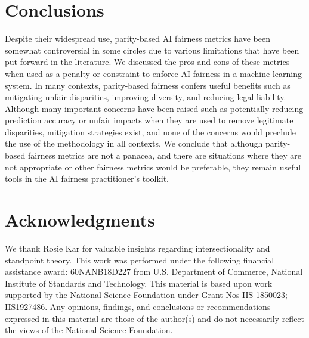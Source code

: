 \documentclass[11pt,dvipdfm]{article}
\begin{document}
	
	
 

\section{Conclusions}
Despite their widespread use, parity-based AI fairness metrics have been somewhat controversial in some circles due to various limitations that have been put forward in the literature.  We discussed the pros and cons of these metrics when used as a penalty or constraint to enforce AI fairness in a machine learning system.  In many contexts, parity-based fairness confers useful benefits such as mitigating unfair disparities, improving diversity, and reducing legal liability.  Although many important concerns have been raised such as potentially reducing prediction accuracy or unfair impacts when they are used to remove legitimate disparities, mitigation strategies exist, and none of the concerns would preclude the use of the methodology in all contexts.  We conclude that although parity-based fairness metrics are not a panacea, and there are situations where they are not appropriate or other fairness metrics would be preferable, they remain useful tools in the AI fairness practitioner's toolkit.

\section{Acknowledgments}
We thank Rosie Kar for valuable insights regarding intersectionality and standpoint theory. This work was performed under the following financial assistance award: 60NANB18D227 from U.S. Department of Commerce, National Institute of Standards and Technology. This material is based upon work supported by the National Science Foundation under Grant Nos IIS 1850023; IIS1927486.  Any opinions, findings, and conclusions or recommendations expressed in this material are those of the author(s) and do not necessarily reflect the views of the National Science Foundation.

\newpage
 
\vspace{-.1cm}
%
%
%
\end{document}
